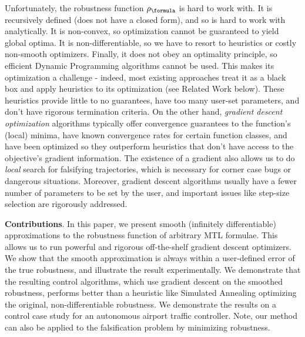 

Unfortunately, the robustness function $\robf$ is hard to work with.
It is recursively defined (does not have a closed form), and so is hard to work with analytically.
It is non-convex, so optimization cannot be guaranteed to yield global optima.
It is non-differentiable, so we have to resort to heuristics or costly non-smooth optimizers. 
Finally, it does not obey an optimality principle, so efficient Dynamic Programming algorithms cannot be used.
This makes its optimization a challenge - indeed, most existing approaches treat it as a black box and apply heuristics to its optimization (see Related Work below).
These heuristics provide little to no guarantees, have too many user-set parameters, and don't have rigorous termination criteria.
On the other hand, \textit{gradient descent optimization} algorithms typically offer convergence guarantees to the function's (local) minima, have known convergence rates for certain function classes, and have been optimized so they outperform heuristics that don't have access to the objective's gradient information.
The existence of a gradient also allows us to do \textit{local} search for falsifying trajectories, which is necessary for corner case bugs or dangerous situations.
Moreover, gradient descent algorithms usually have a fewer number of parameters to be set by the user, and important issues like step-size selection are rigorously addressed.

\textbf{Contributions}. In this paper, we present smooth (infinitely differentiable) approximations to the robustness function of arbitrary MTL formulae.
This allows us to run powerful and rigorous off-the-shelf gradient descent optimizers.
We show that the smooth approximation is always within a user-defined error of the true robustness, and illustrate the result experimentally.
We demonstrate that the resulting control algorithms, which use gradient descent on the smoothed robustness, performs better than a heuristic like Simulated Annealing optimizing the original, non-differentiable robustness.
We demonstrate the results on a control case study for an autonomous airport traffic controller. Note, our method can also be applied to the falsification problem \cite{AbbasATVA11_LinFalsification} by minimizing robustness.

